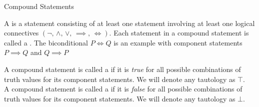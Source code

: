 \vspace*{2em}

\begin{mdframed}
\begin{center}
{\Large Compound Statements}
\end{center}
\end{mdframed}

\begin{definition}
A  is a statement consisting of at least one statement involving at least one logical connectives $(\neg,\,\wedge,\,\vee,\,\implies,\,\iff)$. Each statement in a compound statement is called a . The biconditional $P \iff Q$ is an example with component statements $P \implies Q$ and $Q \implies P$
\end{definition}

\vspace*{1em}

\begin{definition}
A compound statement is called a  if it is \emph{true} for all possible combinations of truth values for its component statements. We will denote any tautology as $\top$.\\[0.5em]
A compound statement is called a  if it is \emph{false} for all possible combinations of truth values for its component statements. We will denote any tautology as $\bot$.
\end{definition}

\vspace*{1em}


